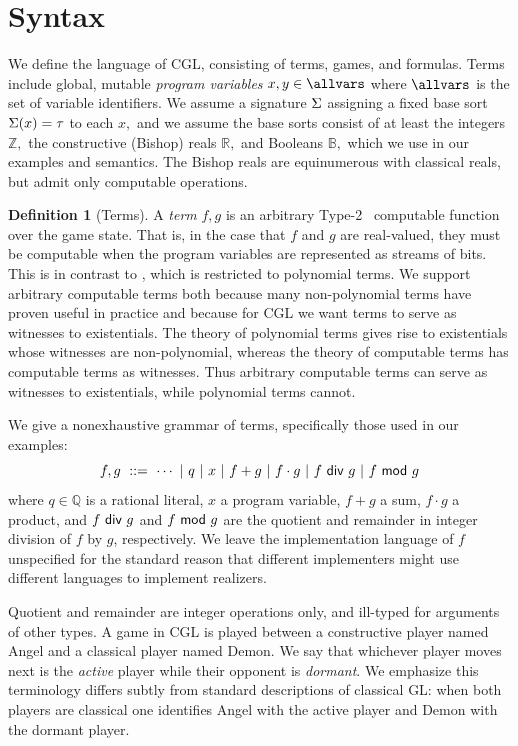 \documentclass[12pt]{cmuthesis}
\theoremstyle{definition}
\newtheorem{definition}{Definition}
\theoremstyle{remark}
\newcommand{\bebecomes}{\mathrel{::=}}
\newcommand{\alternative}{~|~}
\newcommand{\rref}[2][]{\prettyref{#2}}
\newcommand{\CGL}{\textsf{CGL}\xspace}
\newcommand{\GL}{GL\xspace}
\begin{document}
\section{Syntax}
We define the language of \CGL, consisting of terms, games, and formulas.
Terms include global, mutable \emph{program variables} $x, y \in \allvars$ where $\allvars$ is the set of variable identifiers.
We assume a signature $\Sigma$ assigning a fixed base sort $\Sigma(x) = \tau$ to each $x,$ and we assume the base sorts consist of at least the integers $\mathbb{Z},$ the constructive (Bishop) reals $\mathbb{R},$ and Booleans $\mathbb{B},$ which we use in our examples and semantics.
The Bishop reals are equinumerous with classical reals, but admit only computable operations.
\begin{definition}[Terms]
A \emph{term} $f, g$ is an arbitrary Type-2~\cite{DBLP:series/txtcs/Weihrauch00} computable function over the game state.
That is, in the case that $f$ and $g$ are real-valued, they must be computable when the program variables are represented as streams of bits.
This is in contrast to \dGL, which is restricted to polynomial terms.
We support arbitrary computable terms both because many non-polynomial terms have proven useful in practice and because for \CGL we want terms to serve as witnesses to existentials.
The theory of polynomial terms gives rise to existentials whose witnesses are non-polynomial, whereas the theory of computable terms has computable terms as witnesses.
Thus arbitrary computable terms can serve as witnesses to existentials, while polynomial terms cannot.

We give a nonexhaustive grammar of terms, specifically those used in our examples:
\[f,g ~\bebecomes~  \cdots \alternative q \alternative x \alternative f + g \alternative f \cdot g \alternative \ediv{f}{g} \alternative \emod{f}{g}\]
where $q \in \mathbb{Q}$ is a rational literal, $x$ a program variable, $f + g$ a sum, $f \cdot g$ a product, and $f~\textsf{div}~g$ and $f~\textsf{mod}~g$ are the quotient and remainder in integer division of $f$ by $g$, respectively.
We leave the implementation language of $f$ unspecified for the standard reason that different implementers might use different languages to implement realizers.
\label{def:terms}
 \end{definition}
Quotient and remainder are integer operations only, and ill-typed for arguments of other types.
A game in \CGL is played between a constructive player named Angel and a classical player named Demon.
We say that whichever player moves next is the \emph{active} player while their opponent is \emph{dormant}.
We emphasize this terminology differs subtly from standard descriptions of classical \GL: when both players are classical one identifies Angel with the active player and Demon with the dormant player.
\end{document}
